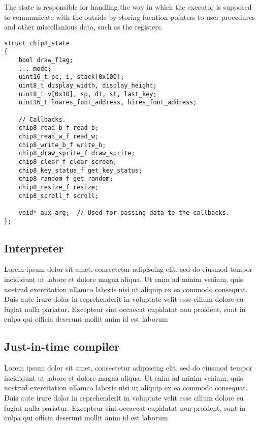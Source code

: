 \par The state is responsible for handling the way in which the executor is supposed to communicate with the outside by storing fucntion pointers to user procedures and other miscellanious data, such as the registers.

\begin{verbatim}
struct chip8_state
{
    bool draw_flag;
    ... mode;
    uint16_t pc, i, stack[0x100];
    uint8_t display_width, display_height;
    uint8_t v[0x10], sp, dt, st, last_key;
    uint16_t lowres_font_address, hires_font_address;
    
    // Callbacks.
    chip8_read_b_f read_b;
    chip8_read_w_f read_w;
    chip8_write_b_f write_b;
    chip8_draw_sprite_f draw_sprite;
    chip8_clear_f clear_screen;
    chip8_key_status_f get_key_status;
    chip8_random_f get_random;
    chip8_resize_f resize;
    chip8_scroll_f scroll;
    
    void* aux_arg;  // Used for passing data to the callbacks.
};
\end{verbatim}

\subsection{Interpreter}
\label{subsec:ch3sec3sub1}

\par Lorem ipsum dolor sit amet, consectetur adipiscing elit, sed do eiusmod tempor incididunt ut labore et dolore magna aliqua. Ut enim ad minim veniam, quis nostrud exercitation ullamco laboris nisi ut aliquip ex ea commodo consequat. Duis aute irure dolor in reprehenderit in voluptate velit esse cillum dolore eu fugiat nulla pariatur. Excepteur sint occaecat cupidatat non proident, sunt in culpa qui officia deserunt mollit anim id est laborum

\subsection{Just-in-time compiler}
\label{subsec:ch3sec3sub2}

\par Lorem ipsum dolor sit amet, consectetur adipiscing elit, sed do eiusmod tempor incididunt ut labore et dolore magna aliqua. Ut enim ad minim veniam, quis nostrud exercitation ullamco laboris nisi ut aliquip ex ea commodo consequat. Duis aute irure dolor in reprehenderit in voluptate velit esse cillum dolore eu fugiat nulla pariatur. Excepteur sint occaecat cupidatat non proident, sunt in culpa qui officia deserunt mollit anim id est laborum


